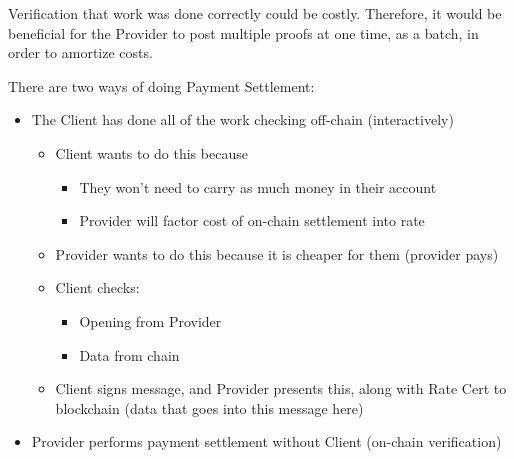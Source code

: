 \documentclass{article}
\begin{document}
Verification that work was done correctly could be costly. Therefore, it would be beneficial for the Provider to post multiple proofs at one time, as a batch, in order to amortize costs.

There are two ways of doing Payment Settlement:
\begin{itemize}
    \item The Client has done all of the work checking off-chain (interactively)
    \begin{itemize}
        \item Client wants to do this because
        \begin{itemize}
            \item They won’t need to carry as much money in their account
            \item Provider will factor cost of on-chain settlement into rate
        \end{itemize}
        \item Provider wants to do this because it is cheaper for them (provider pays)
        \item Client checks:
        \begin{itemize}
            \item Opening from Provider
            \item Data from chain
        \end{itemize}
        \item Client signs message, and Provider presents this, along with Rate Cert to blockchain (data that goes into this message here)
    \end{itemize}
    \item Provider performs payment settlement without Client (on-chain verification)
\end{itemize}
\end{document}
